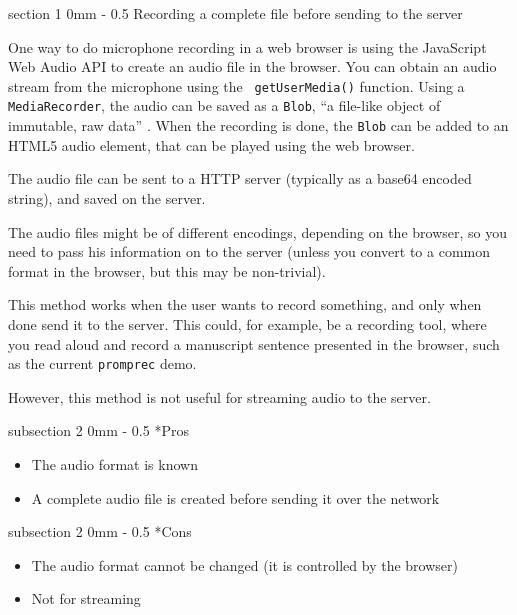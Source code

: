 \documentclass[11pt, a4paper, twoside]{article}
\makeatletter
\renewcommand{\subsection}{\@startsection
  {subsection}%
  {2}%
  {0mm}%
  {-\baselineskip}%
  {0.5\baselineskip}%
  {\bfseries\sffamily\large}}%
\renewcommand{\section}{\@startsection
  {section}%
  {1}%
  {0mm}%
  {-\baselineskip}%
  {0.5\baselineskip}%
  {\bfseries\sffamily\Large}}%
\makeatother
\begin{document}
\section{Recording a complete file before sending to the server}

One way to do microphone recording in a web browser is using the
JavaScript Web Audio API to create an audio file in the browser. You
can obtain an audio stream from the microphone using the {\tt
  getUserMedia()} function. Using a {\tt MediaRecorder}, the audio can
be saved as a {\tt Blob}, ``a file-like object of immutable, raw
data'' \cite{blob}. When the recording is done, the {\tt Blob} can be
added to an HTML5 audio element, that can be played using the web
browser.

The audio file can be sent to a HTTP server (typically as a base64 encoded
string), and saved on the server.

The audio files might be of different encodings, depending on
the browser, so you need to pass his information on to the server
(unless you convert to a common format in the browser, but this may be
non-trivial).

This method works when the user wants to record something, and only
when done send it to the server. This could, for example, be a
recording tool, where you read aloud and record a manuscript sentence
presented in the browser, such as the current {\tt promprec} demo.

However, this method is not useful for streaming audio to the server.

\subsection*{Pros}
\begin{itemize}
\item The audio format is known
\item A complete audio file is created before sending it over the network
\end{itemize}

\subsection*{Cons}
\begin{itemize}
\item The audio format cannot be changed (it is controlled by the browser)
\item Not for streaming
\end{itemize}
\end{document}
